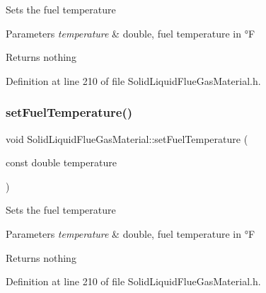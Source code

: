 Sets the fuel temperature 
\begin{DoxyParams}{Parameters}
{\em temperature} & double, fuel temperature in °F \\
\hline
\end{DoxyParams}
\begin{DoxyReturn}{Returns}
nothing 
\end{DoxyReturn}


Definition at line 210 of file Solid\+Liquid\+Flue\+Gas\+Material.\+h.

\mbox{\label{class_solid_liquid_flue_gas_material_a420ba1234c5f8c4b93f190b61046a589}} 
\subsubsection{\texorpdfstring{set\+Fuel\+Temperature()}{setFuelTemperature()}\hspace{0.1cm}{\footnotesize\ttfamily [3/3]}}
{\footnotesize\ttfamily void Solid\+Liquid\+Flue\+Gas\+Material\+::set\+Fuel\+Temperature (\begin{DoxyParamCaption}\item[{const double}]{temperature }\end{DoxyParamCaption})\hspace{0.3cm}{\ttfamily [inline]}}

Sets the fuel temperature 
\begin{DoxyParams}{Parameters}
{\em temperature} & double, fuel temperature in °F \\
\hline
\end{DoxyParams}
\begin{DoxyReturn}{Returns}
nothing 
\end{DoxyReturn}


Definition at line 210 of file Solid\+Liquid\+Flue\+Gas\+Material.\+h.

\mbox{\label{class_solid_liquid_flue_gas_material_a6046d06703bd496745121b62eab4f40f}} 
